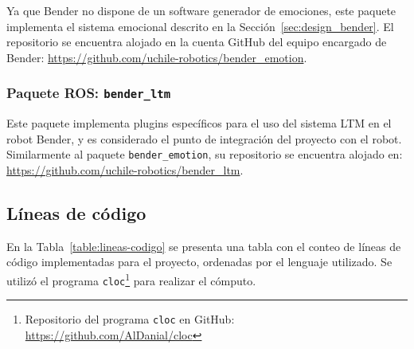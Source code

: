 Ya que Bender no dispone de un software generador de emociones, este paquete implementa el sistema emocional descrito en la Sección~\ref{sec:design_bender}. El repositorio se encuentra alojado en la cuenta GitHub del equipo encargado de Bender: \url{https://github.com/uchile-robotics/bender\_emotion}.


\subsubsection{Paquete ROS: \texttt{bender\_ltm}}

Este paquete implementa plugins específicos para el uso del sistema LTM en el robot Bender, y es considerado el punto de integración del proyecto con el robot. Similarmente al paquete \texttt{bender\_emotion}, su repositorio se encuentra alojado en: \url{https://github.com/uchile-robotics/bender\_ltm}.


\subsection{Líneas de código}

En la Tabla~\ref{table:lineas-codigo} se presenta una tabla con el conteo de líneas de código implementadas para el proyecto, ordenadas por el lenguaje utilizado. Se utilizó el programa \texttt{cloc}\footnote{Repositorio del programa \texttt{cloc} en GitHub: \url{https://github.com/AlDanial/cloc}} para realizar el cómputo.


